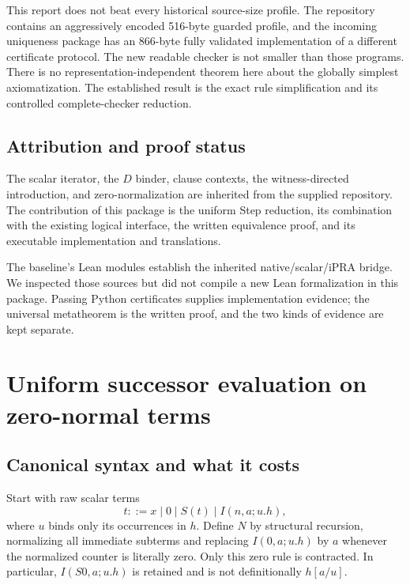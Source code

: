\documentclass[11pt,letterpaper]{article}
\theoremstyle{definition}
\begin{document}
This report does not beat every historical source-size profile.
The repository contains an aggressively encoded 516-byte guarded
profile, and the incoming uniqueness package has an 866-byte fully
validated implementation of a different certificate protocol. The new
readable checker is not smaller than those programs. There is no
representation-independent theorem here about the globally simplest
axiomatization. The established result is the exact rule simplification
and its controlled complete-checker reduction.

\subsection{Attribution and proof status}

The scalar iterator, the \(D\) binder, clause contexts, the
witness-directed introduction, and zero-normalization are inherited
from the supplied repository. The contribution of this package is the
uniform Step reduction, its combination with the existing logical
interface, the written equivalence proof, and its executable
implementation and translations.

The baseline's Lean modules establish the inherited native/scalar/iPRA
bridge. We inspected those sources but did not compile a new Lean
formalization in this package. Passing Python certificates supplies
implementation evidence; the universal metatheorem is the written
proof, and the two kinds of evidence are kept separate.


\section{Uniform successor evaluation on zero-normal terms}
\label{sec:uniform-step-theory}

\subsection{Canonical syntax and what it costs}

Start with raw scalar terms
\[
 t ::= x\mid 0\mid S(t)\mid I(n,a;u.h),
\]
where $u$ binds only its occurrences in $h$. Define $N$ by structural
recursion, normalizing all immediate subterms and replacing
$I(0,a;u.h)$ by $a$ whenever the normalized counter is literally zero.
Only this zero rule is contracted. In particular,
$I(S0,a;u.h)$ is retained and is not definitionally $h[a/u]$.
\end{document}
